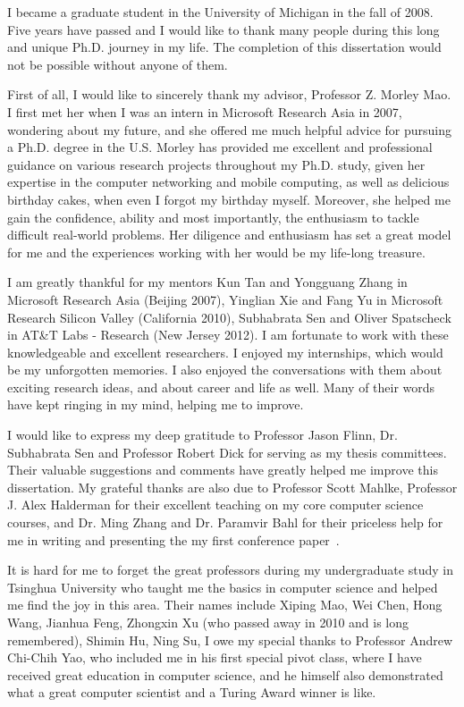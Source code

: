 \startacknowledgementspage

I became a graduate student in the University of Michigan in the fall of 2008. Five years have passed and I would like to thank many people during this long and unique Ph.D. journey in my life. The completion of this dissertation would not be possible without anyone of them.

First of all, I would like to sincerely thank my advisor, Professor Z. Morley Mao. I first met her when I was an intern in Microsoft Research Asia in 2007, wondering about my future, and she offered me much helpful advice for pursuing a Ph.D. degree in the U.S. Morley has provided me excellent and professional guidance on various research projects throughout my Ph.D. study, given her expertise in the computer networking and mobile computing, as well as delicious birthday cakes, when even I forgot my birthday myself. Moreover, she helped me gain the confidence, ability and most importantly, the enthusiasm to tackle difficult real-world problems. Her diligence and enthusiasm has set a great model for me and the experiences working with her would be my life-long treasure.

I am greatly thankful for my mentors Kun Tan and Yongguang Zhang in Microsoft Research Asia (Beijing 2007), Yinglian Xie and Fang Yu in Microsoft Research Silicon Valley (California 2010), Subhabrata Sen and Oliver Spatscheck in AT\&T Labs - Research (New Jersey 2012). I am fortunate to work with these knowledgeable and excellent researchers. I enjoyed my internships, which would be my unforgotten memories. I also enjoyed the conversations with them about exciting research ideas, and about career and life as well. Many of their words have kept ringing in my mind, helping me to improve.

I would like to express my deep gratitude to Professor Jason Flinn, Dr. Subhabrata Sen and Professor Robert Dick for serving as my thesis committees. Their valuable suggestions and comments have greatly helped me improve this dissertation. My grateful thanks are also due to Professor Scott Mahlke, Professor J. Alex Halderman for their excellent teaching on my core computer science courses, and Dr. Ming Zhang and Dr. Paramvir Bahl for their priceless help for me in writing and presenting the my first conference paper~\cite{mobisys.3gtest}.

It is hard for me to forget the great professors during my undergraduate study in Tsinghua University who taught me the basics in computer science and helped me find the joy in this area. Their names include Xiping Mao, Wei Chen, Hong Wang, Jianhua Feng, Zhongxin Xu (who passed away in 2010 and is long remembered), Shimin Hu, Ning Su, \etc I owe my special thanks to Professor Andrew Chi-Chih Yao, who included me in his first special pivot class, where I have received great education in computer science, and he himself also demonstrated what a great computer scientist and a Turing Award winner is like.


